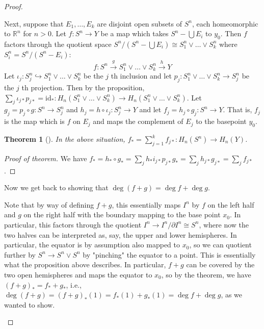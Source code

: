 \documentclass[reqno]{amsart}
\newtheorem{theorem}{Theorem}[section]
\theoremstyle{definition}
\theoremstyle{remark}
\newcommand{\id}{{\mathrm{id}}}
\begin{document}
\begin{proof}
\begin{enumerate}
        Next, suppose that $E_1, \ldots, E_k$ are
        disjoint open subsets of $S^{n}$, each homeomorphic to
        $\mathbb{R}^{n}$ for $n>0$.
        Let $f \colon S^{n} \to Y$ be a map which takes
        $S^{n} - \bigcup E_i $ to $y_0$. Then
        $f$ factors through the quotient space
        $S^{n} / \left( S^{n} - \bigcup E_i  \right) 
        \cong S_1^{n} \vee \ldots \vee S_k^{n}$ where
        $S_i^{n} = S^{n} / \left( S^{n} - E_i \right) $:
        \[
            f \colon S^{n} \stackrel{g}{\to }
            S_1^{n} \vee \ldots \vee S_k^{n}
            \stackrel{h}{\to } Y
        \] 
        Let $\iota_{j} \colon S_j^{n} 
        \hookrightarrow S_1^{n} \vee \ldots \vee
        S_k^{n}$ be the $j$ th inclusion and let
        $p_j \colon S_1^{n} \vee \ldots \vee
        S_k^{n} \to S_j^{n}$ be the $j$ th projection.
        Then by the proposition,
        $\sum_j \iota_{j*} p_{j*} = \id_* \colon
        H_n \left( S_1^{n} \vee \ldots \vee S_k^{n} \right) 
        \to H_n \left( S_1^{n} \vee \ldots \vee
        S_k^{n}\right) $. Let
        $g_j = p_j \circ g \colon S^{n} \to S_j^{n}$ and
        $h_j = h \circ \iota_j \colon
        S_j^{n} \to Y$ and let
        $f_j = h_j \circ g_j \colon  S^{n} \to Y$.
        That is, $f_j$ is the map which is $f$ on
        $E_j$ and maps the complement of $E_j$ to the basepoint
        $y_0$.

        \begin{theorem}[]
            In the above situation, $f_*
            = \sum_{j=1}^{k} f_{j*} \colon
            H_n\left( S^{n} \right) \to H_n(Y)$.
        \end{theorem}

        \begin{proof}[Proof of theorem]
            We have
            $f_* = 
            h_* \circ g_* = 
            \sum_j h_* i_{j*} p_{j*} g_*
            = \sum_j h_{j*} g_{j*}
            = \sum_j f_{j*}$.
        \end{proof}

        Now we get back to showing that
        $\deg \left( f+g \right) = \deg f + \deg g$.

        Note that by way of defining
        $f+g$, this essentially maps $I^{n}$ by
        $f$ on the left half and $g$ on the right half with
        the boundary mapping to the base point $x_0$.
        In particular, this factors through the
        quotient $I^{n} \to I^{n} / \partial I^{n} 
        \cong S^{n}$, where now the two halves can be interpreted
        as, say, the upper and lower hemispheres. In particular,
        the equator is by assumption also mapped to
        $x_0$, so we can quotient further by
        $S^{n} \to S^{n} \vee S^{n}$ by "pinching" the equator
        to a point. This is essentially what the proposition
        above describes. In particular, $f+g$ can be covered
        by the two open hemispheres and maps the equator
        to $x_0$, so by the theorem,
        we have $\left( f+g \right)_*
        = f_* + g_*$, i.e.,
        $\deg (f+g) = \left( f+g \right)_*(1)
        = f_*(1) + g_*(1) = \deg f + \deg g$, as we wanted
        to show.


\end{enumerate}
\end{proof}
\end{document}
